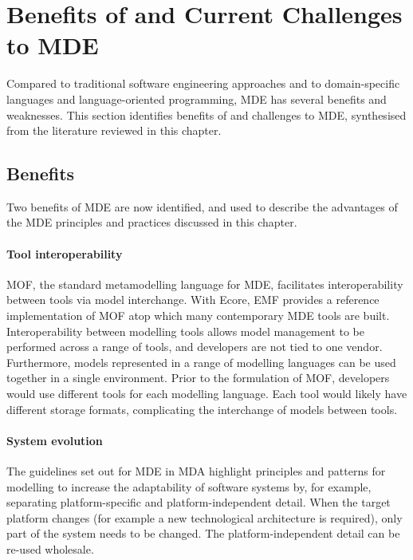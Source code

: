 
\section{Benefits of and Current Challenges to MDE}
\label{sec:mde_benefits_and_challenges}
Compared to traditional software engineering approaches and to domain-specific languages and language-oriented programming, MDE has several benefits and weaknesses. This section identifies benefits of and challenges to MDE, synthesised from the literature reviewed in this chapter.

\subsection{Benefits}
\label{subsec:mde_benefits}
Two benefits of MDE are now identified, and used to describe the advantages of the MDE principles and practices discussed in this chapter. 

\paragraph{Tool interoperability} MOF, the standard metamodelling language for MDE, facilitates interoperability between tools via model interchange. With Ecore, EMF provides a reference implementation of MOF atop which many contemporary MDE tools are built. Interoperability between modelling tools allows model management to be performed across a range of tools, and developers are not tied to one vendor. Furthermore, models represented in a range of modelling languages can be used together in a single environment. Prior to the formulation of MOF, developers would use different tools for each modelling language. Each tool would likely have different storage formats, complicating the interchange of models between tools.

\paragraph{System evolution} The guidelines set out for MDE in MDA \cite{mda} highlight principles and patterns for modelling to increase the adaptability of software systems by, for example, separating platform-specific and platform-independent detail. When the target platform changes (for example a new technological architecture is required), only part of the system needs to be changed. The platform-independent detail can be re-used wholesale. 

